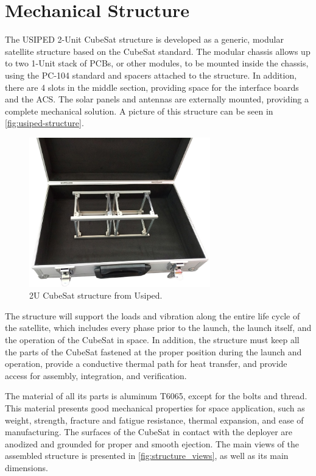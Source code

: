 \section{Mechanical Structure}

The USIPED 2-Unit CubeSat structure is developed as a generic, modular satellite structure based on the CubeSat standard. The modular chassis allows up to two 1-Unit stack of PCBs, or other modules, to be mounted inside the chassis, using the PC-104 standard and spacers attached to the structure. In addition, there are 4 slots in the middle section, providing space for the interface boards and the ACS. The solar panels and antennas are externally mounted, providing a complete mechanical solution. A picture of this structure can be seen in \autoref{fig:usiped-structure}.

\begin{figure}[!ht]
    \begin{center}
        \includegraphics[width=0.7\textwidth]{figures/usiped-2u-structure.jpg}
        \caption{2U CubeSat structure from Usiped.}
        \label{fig:usiped-structure}
    \end{center}
\end{figure}

The structure will support the loads and vibration along the entire life cycle of the satellite, which includes every phase prior to the launch, the launch itself, and the operation of the CubeSat in space. In addition, the structure must keep all the parts of the CubeSat fastened at the proper position during the launch and operation, provide a conductive thermal path for heat transfer, and provide access for assembly, integration, and verification.

The material of all its parts is aluminum T6065, except for the bolts and thread. This material presents good mechanical properties for space application, such as weight, strength, fracture and fatigue resistance, thermal expansion, and ease of manufacturing. The surfaces of the CubeSat in contact with the deployer are anodized and grounded for proper and smooth ejection. The main views of the assembled structure is presented in \autoref{fig:structure_views}, as well as its main dimensions.


